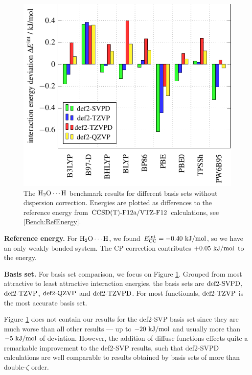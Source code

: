 \begin{figure}[b!]
\includegraphics[width=.7\textwidth]{TikzPics/TikzCreation/Bench/BenchH2O+H.NoD3.pdf}
\caption{The $\mbox{\ensuremath{\text H _2 \text O \cdots \text H}}$ benchmark results for different basis sets without dispersion correction.
Energies are plotted as differences to the reference energy from $\text{CCSD(T)-F12a}/\text{VTZ-F}12$ calculations,
see \eqref{Bench:RefEnergy}.}
\label{Fig:Bench:H2O+H:NoD3}
\end{figure}

\textbf{Reference energy.} For $\mbox{\ensuremath{\text H _2 \text O \cdots \text H}}$, we found \mbox{$E^{\text{int}}_{\text {CC}}=-0.40\ \text {kJ/mol}$}, so
we have an only weakly bonded system. The CP correction contributes $+0.05\ \text {kJ/mol}$ to
the energy.

\textbf{Basis set.} For basis set comparison, we focus on Figure
\ref{Fig:Bench:H2O+H:NoD3}. Grouped from most attractive to least attractive
interaction energies, the basis sets are $\text{def2-SVPD}$, $\text{def2-TZVP}$, $\text{def2-QZVP}$ and $\text{def2-TZVPD}$.
For most functionals, $\text{def2-TZVP}$ is the most accurate basis set.

Figure \ref{Fig:Bench:H2O+H:NoD3} does not contain our results for the def2-SVP basis
set since they are much worse than all other results --- up to $-20\ \text {kJ/mol}$ and
usually more than $-5\ \text {kJ/mol}$ of deviation. However, the addition of diffuse
functions effects quite a remarkable improvement to the def2-SVP results, such
that def2-SVPD calculations are well comparable to results obtained by basis
sets of more than double-$\zeta$ order.

